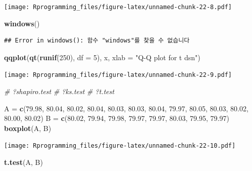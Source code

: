 \documentclass[10pt,]{krantz}
\makeatletter
\newenvironment{Shaded}{\begin{snugshade}}{\end{snugshade}}
\newcommand{\KeywordTok}[1]{\textcolor[rgb]{0.13,0.29,0.53}{\textbf{#1}}}
\newcommand{\DataTypeTok}[1]{\textcolor[rgb]{0.13,0.29,0.53}{#1}}
\newcommand{\DecValTok}[1]{\textcolor[rgb]{0.00,0.00,0.81}{#1}}
\newcommand{\FloatTok}[1]{\textcolor[rgb]{0.00,0.00,0.81}{#1}}
\newcommand{\StringTok}[1]{\textcolor[rgb]{0.31,0.60,0.02}{#1}}
\newcommand{\CommentTok}[1]{\textcolor[rgb]{0.56,0.35,0.01}{\textit{#1}}}
\newcommand{\NormalTok}[1]{#1}
\newenvironment{kframe}{%
\medskip{}
\setlength{\fboxsep}{.8em}
 \def\at@end@of@kframe{}%
 \ifinner\ifhmode%
  \def\at@end@of@kframe{\end{minipage}}%
  \begin{minipage}{\columnwidth}%
 \fi\fi%
 \def\FrameCommand##1{\hskip\@totalleftmargin \hskip-\fboxsep
 \colorbox{shadecolor}{##1}\hskip-\fboxsep
     \hskip-\linewidth \hskip-\@totalleftmargin \hskip\columnwidth}%
 \MakeFramed {\advance\hsize-\width
   \@totalleftmargin\z@ \linewidth\hsize
   \@setminipage}}%
 {\par\unskip\endMakeFramed%
 \at@end@of@kframe}
\renewenvironment{Shaded}{\begin{kframe}}{\end{kframe}}
\makeatother
\begin{document}
\texttt{[image: Rprogramming\_files/figure-latex/unnamed-chunk-22-8.pdf]}

\begin{Shaded}
\begin{Highlighting}[]
\KeywordTok{windows}\NormalTok{()}
\end{Highlighting}
\end{Shaded}

\begin{verbatim}
## Error in windows(): 함수 "windows"를 찾을 수 없습니다
\end{verbatim}

\begin{Shaded}
\begin{Highlighting}[]
\KeywordTok{qqplot}\NormalTok{(}\KeywordTok{qt}\NormalTok{(}\KeywordTok{runif}\NormalTok{(}\DecValTok{250}\NormalTok{), }\DataTypeTok{df =} \DecValTok{5}\NormalTok{), x, }\DataTypeTok{xlab =} \StringTok{"Q-Q plot for t dsn"}\NormalTok{)}
\end{Highlighting}
\end{Shaded}

\texttt{[image: Rprogramming\_files/figure-latex/unnamed-chunk-22-9.pdf]}

\begin{Shaded}
\begin{Highlighting}[]
\CommentTok{# ?shapiro.test}
\CommentTok{# ?ks.test}
\CommentTok{# ?t.test}


\NormalTok{A =}\StringTok{ }\KeywordTok{c}\NormalTok{(}\FloatTok{79.98}\NormalTok{, }\FloatTok{80.04}\NormalTok{, }\FloatTok{80.02}\NormalTok{, }\FloatTok{80.04}\NormalTok{, }\FloatTok{80.03}\NormalTok{, }\FloatTok{80.03}\NormalTok{, }\FloatTok{80.04}\NormalTok{, }\FloatTok{79.97}\NormalTok{, }\FloatTok{80.05}\NormalTok{, }\FloatTok{80.03}\NormalTok{, }\FloatTok{80.02}\NormalTok{, }\FloatTok{80.00}\NormalTok{, }\FloatTok{80.02}\NormalTok{)}
\NormalTok{B =}\StringTok{ }\KeywordTok{c}\NormalTok{(}\FloatTok{80.02}\NormalTok{, }\FloatTok{79.94}\NormalTok{, }\FloatTok{79.98}\NormalTok{, }\FloatTok{79.97}\NormalTok{, }\FloatTok{79.97}\NormalTok{, }\FloatTok{80.03}\NormalTok{, }\FloatTok{79.95}\NormalTok{, }\FloatTok{79.97}\NormalTok{)}
\KeywordTok{boxplot}\NormalTok{(A, B)}
\end{Highlighting}
\end{Shaded}

\texttt{[image: Rprogramming\_files/figure-latex/unnamed-chunk-22-10.pdf]}

\begin{Shaded}
\begin{Highlighting}[]
\KeywordTok{t.test}\NormalTok{(A, B)}
\end{Highlighting}
\end{Shaded}
\end{document}

